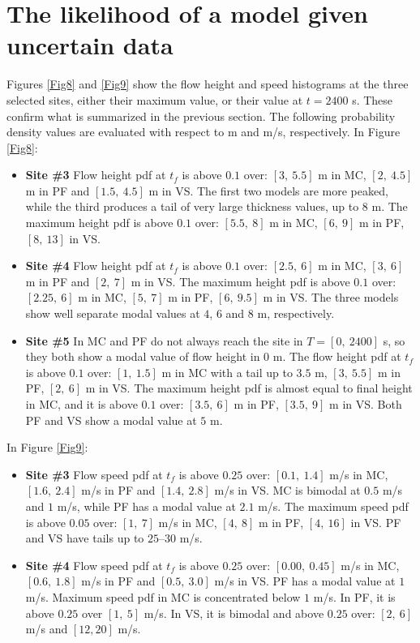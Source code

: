 \documentclass[nhess, manuscript]{copernicus}
\begin{document}
\section{The likelihood of a model given uncertain data}\label{s4}
Figures \ref{Fig8} and \ref{Fig9} show the flow height and speed histograms at the three selected sites, either their maximum value, or  their value at $t=2400$ s. These confirm what is summarized in the previous section. The following probability density values  are evaluated with respect to m and m/s, respectively. In Figure \ref{Fig8}:
\begin{itemize}
\item\textbf{Site \#3} Flow height pdf at $t_f$ is above $0.1$ over: $[3,\ 5.5]$ m in MC, $[2,\ 4.5]$ m in PF and $[1.5,\ 4.5]$ m in VS. The first two models are more peaked, while the third produces a tail of very large thickness values, up to $8$ m. The maximum height pdf is above $0.1$ over: $[5.5,\ 8]$ m in MC, $[6,\ 9]$ m in PF, $[8,\ 13]$ in VS.
\item\textbf{Site \#4} Flow height pdf at $t_f$ is above $0.1$ over: $[2.5,\ 6]$ m in MC, $[3,\ 6]$ m in PF and $[2,\ 7]$ m in VS. The maximum height pdf is above $0.1$ over: $[2.25,\ 6]$ m in MC, $[5,\ 7]$ m in PF, $[6,\ 9.5]$ m in VS. The three models show well separate modal values at $4$, $6$ and $8$ m, respectively.
\item\textbf{Site \#5} In MC and PF do not always reach the site in $T=[0,\ 2400]$ s, so they both show a modal value of flow height in $0$ m. The flow height pdf at $t_f$ is above $0.1$ over: $[1,\ 1.5]$ m in MC with a tail up to $3.5$ m, $[3,\ 5.5]$ m in PF, $[2,\ 6]$ m in VS. The maximum height pdf is almost equal to final height in MC, and it is above $0.1$ over: $[3.5,\ 6]$ m in PF, $[3.5,\ 9]$ m in VS. Both PF and VS show a modal value at $5$ m.
\end{itemize}
In Figure \ref{Fig9}:
\begin{itemize}
\item\textbf{Site \#3} Flow speed pdf at $t_f$ is above $0.25$ over: $[0.1,\ 1.4]$ m/s in MC, $[1.6,\ 2.4]$ m/s in PF and $[1.4,\ 2.8]$  m/s in VS. MC is bimodal at $0.5$ m/s and $1$ m/s, while PF has a modal value at $2.1$ m/s. The maximum speed pdf is above $0.05$ over: $[1,\ 7]$ m/s in MC, $[4,\ 8]$ m in PF, $[4,\ 16]$ in VS. PF and VS have tails up to $25$--$30$ m/s.
\item\textbf{Site \#4} Flow speed pdf at $t_f$ is above $0.25$ over: $[0.00,\ 0.45]$ m/s in MC, $[0.6,\ 1.8]$ m/s in PF and $[0.5,\ 3.0]$  m/s in VS. PF has a modal value at $1$ m/s. Maximum speed pdf in MC is concentrated below $1$ m/s. In PF, it is above $0.25$ over $[1,\ 5]$ m/s. In VS, it is bimodal and above $0.25$ over: $[2,\ 6]$ m/s and $[12, 20]$ m/s.
\end{itemize}
\end{document}
